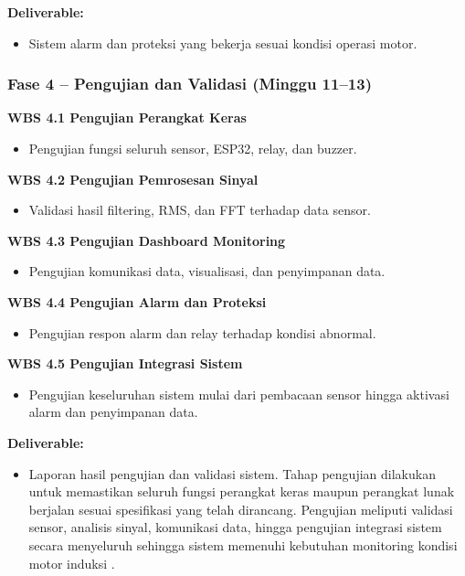 \documentclass{elsinta}
\begin{document}
\textbf{Deliverable:}
\begin{itemize}
    \item Sistem alarm dan proteksi yang bekerja sesuai kondisi operasi motor.
\end{itemize}

\subsubsection*{Fase 4 -- Pengujian dan Validasi (Minggu 11--13)}

\textbf{WBS 4.1 Pengujian Perangkat Keras}

\begin{itemize}
    \item Pengujian fungsi seluruh sensor, ESP32, relay, dan buzzer.
\end{itemize}

\textbf{WBS 4.2 Pengujian Pemrosesan Sinyal}

\begin{itemize}
    \item Validasi hasil filtering, RMS, dan FFT terhadap data sensor.
\end{itemize}

\textbf{WBS 4.3 Pengujian Dashboard Monitoring}

\begin{itemize}
    \item Pengujian komunikasi data, visualisasi, dan penyimpanan data.
\end{itemize}

\textbf{WBS 4.4 Pengujian Alarm dan Proteksi}

\begin{itemize}
    \item Pengujian respon alarm dan relay terhadap kondisi abnormal.
\end{itemize}

\textbf{WBS 4.5 Pengujian Integrasi Sistem}

\begin{itemize}
    \item Pengujian keseluruhan sistem mulai dari pembacaan sensor hingga aktivasi alarm dan penyimpanan data.
\end{itemize}

\textbf{Deliverable:}
\begin{itemize}
    \item Laporan hasil pengujian dan validasi sistem.
    Tahap pengujian dilakukan untuk memastikan seluruh fungsi perangkat keras maupun perangkat lunak berjalan sesuai spesifikasi yang telah dirancang. Pengujian meliputi validasi sensor, analisis sinyal, komunikasi data, hingga pengujian integrasi sistem secara menyeluruh sehingga sistem memenuhi kebutuhan monitoring kondisi motor induksi \cite{PMBOK,jardine2006}.
\end{itemize}
\end{document}
